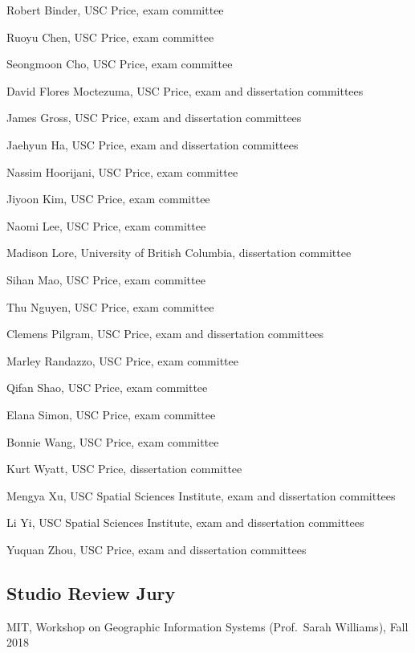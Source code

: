 \documentclass[11pt,letterpaper]{report} %
\newcommand{\listitemspace}{0.25em}
\renewenvironment{itemize}
{
  \begin{list}{}{\setlength{\leftmargin}{0em}
      \setlength{\parskip}{0em}
      \setlength{\itemsep}{\listitemspace}
  \setlength{\parsep}{\listitemspace}}}
  {
\end{list}}
\begin{document}
\begin{itemize}

  \item Robert Binder, USC Price, exam committee
  \item Ruoyu Chen, USC Price, exam committee
  \item Seongmoon Cho, USC Price, exam committee
  \item David Flores Moctezuma, USC Price, exam and dissertation committees
  \item James Gross, USC Price, exam and dissertation committees
  \item Jaehyun Ha, USC Price, exam and dissertation committees
  \item Nassim Hoorijani, USC Price, exam committee
  \item Jiyoon Kim, USC Price, exam committee
  \item Naomi Lee, USC Price, exam committee
  \item Madison Lore, University of British Columbia, dissertation committee
  \item Sihan Mao, USC Price, exam committee
  \item Thu Nguyen, USC Price, exam committee
  \item Clemens Pilgram, USC Price, exam and dissertation committees
  \item Marley Randazzo, USC Price, exam committee
  \item Qifan Shao, USC Price, exam committee
  \item Elana Simon, USC Price, exam committee
  \item Bonnie Wang, USC Price, exam committee
  \item Kurt Wyatt, USC Price, dissertation committee
  \item Mengya Xu, USC Spatial Sciences Institute, exam and dissertation committees
  \item Li Yi, USC Spatial Sciences Institute, exam and dissertation committees
  \item Yuquan Zhou, USC Price, exam and dissertation committees

\end{itemize}

\subsection*{Studio Review Jury}

\begin{itemize}

  \item MIT, Workshop on Geographic Information Systems (Prof.\ Sarah Williams), Fall 2018

\end{itemize}
\end{document}
